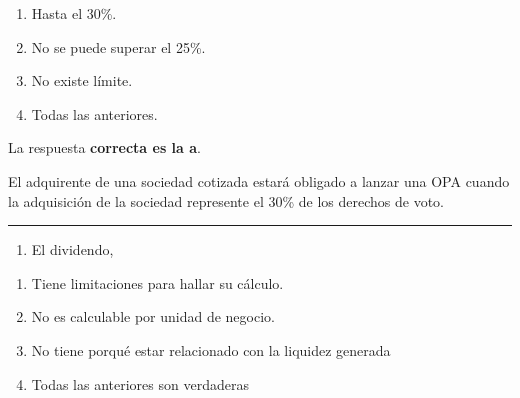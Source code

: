 \documentclass[
  letterpaper,
  DIV=11,
  numbers=noendperiod]{scrreprt}
\providecommand{\tightlist}{%
  \setlength{\itemsep}{0pt}\setlength{\parskip}{0pt}}\usepackage{longtable,booktabs,array}
\begin{document}
\begin{enumerate}
\def\labelenumi{\alph{enumi})}
\item
  Hasta el 30\%.
\item
  No se puede superar el 25\%.
\item
  No existe límite.
\item
  Todas las anteriores.
\end{enumerate}

\begin{tcolorbox}[enhanced jigsaw, left=2mm, opacityback=0, colback=white, breakable, arc=.35mm, bottomrule=.15mm, rightrule=.15mm, toprule=.15mm, leftrule=.75mm, colframe=quarto-callout-tip-color-frame]
\begin{minipage}[t]{5.5mm}
\textcolor{quarto-callout-tip-color}{\faLightbulb}
\end{minipage}%
\begin{minipage}[t]{\textwidth - 5.5mm}

La respuesta \textbf{correcta es la a}.

El adquirente de una sociedad cotizada estará obligado a lanzar una OPA
cuando la adquisición de la sociedad represente el 30\% de los derechos
de voto.

\end{minipage}%
\end{tcolorbox}

\begin{center}\rule{0.5\linewidth}{0.5pt}\end{center}

\begin{enumerate}
\def\labelenumi{\arabic{enumi}.}
\setcounter{enumi}{44}
\tightlist
\item
  El dividendo,
\end{enumerate}

\begin{enumerate}
\def\labelenumi{\alph{enumi})}
\item
  Tiene limitaciones para hallar su cálculo.
\item
  No es calculable por unidad de negocio.
\item
  No tiene porqué estar relacionado con la liquidez generada
\item
  Todas las anteriores son verdaderas
\end{enumerate}
\end{document}
